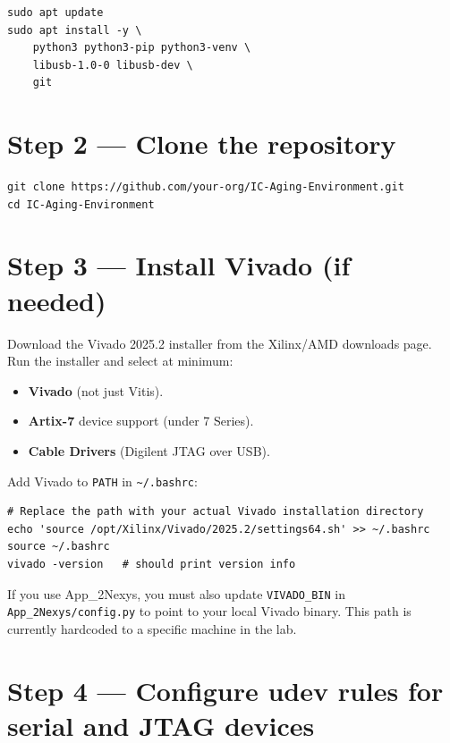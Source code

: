 \documentclass[12pt, a4paper]{report}
\begin{document}
\begin{lstlisting}[style=shell, caption={System package installation}]
sudo apt update
sudo apt install -y \
    python3 python3-pip python3-venv \
    libusb-1.0-0 libusb-dev \
    git
\end{lstlisting}

\section{Step 2 --- Clone the repository}

\begin{lstlisting}[style=shell]
git clone https://github.com/your-org/IC-Aging-Environment.git
cd IC-Aging-Environment
\end{lstlisting}

\section{Step 3 --- Install Vivado (if needed)}

Download the Vivado 2025.2 installer from the Xilinx/AMD downloads page.
Run the installer and select at minimum:

\begin{itemize}
  \item \textbf{Vivado} (not just Vitis).
  \item \textbf{Artix-7} device support (under 7 Series).
  \item \textbf{Cable Drivers} (Digilent JTAG over USB).
\end{itemize}

Add Vivado to \texttt{PATH} in \texttt{\textasciitilde/.bashrc}:

\begin{lstlisting}[style=shell]
# Replace the path with your actual Vivado installation directory
echo 'source /opt/Xilinx/Vivado/2025.2/settings64.sh' >> ~/.bashrc
source ~/.bashrc
vivado -version   # should print version info
\end{lstlisting}

\begin{infobox}
If you use App\_2Nexys, you must also update \texttt{VIVADO\_BIN} in
\texttt{App\_2Nexys/config.py} to point to your local Vivado binary. This path
is currently hardcoded to a specific machine in the lab.
\end{infobox}

\section{Step 4 --- Configure udev rules for serial and JTAG devices}
\end{document}
